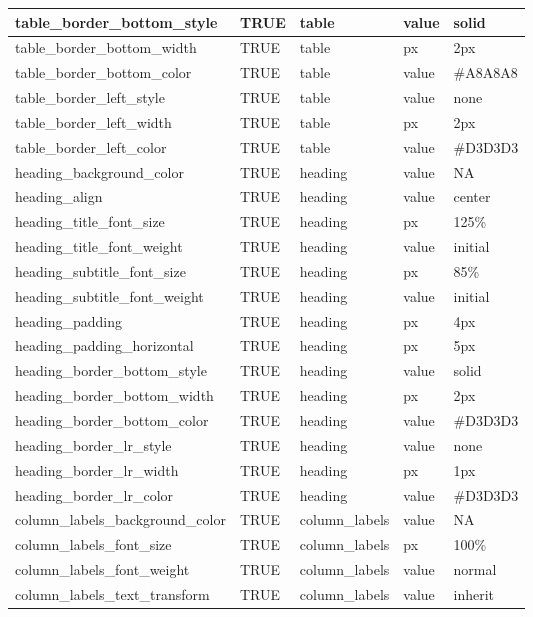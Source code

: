\documentclass[
  letterpaper,
  DIV=11,
  numbers=noendperiod]{scrartcl}
\begin{document}
\begin{table}
{\begin{tabular}[t]{l|l|l|l|l}
\hline
table\_border\_bottom\_style & TRUE & table & value & solid\\
\hline
table\_border\_bottom\_width & TRUE & table & px & 2px\\
\hline
table\_border\_bottom\_color & TRUE & table & value & \#A8A8A8\\
\hline
table\_border\_left\_style & TRUE & table & value & none\\
\hline
table\_border\_left\_width & TRUE & table & px & 2px\\
\hline
table\_border\_left\_color & TRUE & table & value & \#D3D3D3\\
\hline
heading\_background\_color & TRUE & heading & value & NA\\
\hline
heading\_align & TRUE & heading & value & center\\
\hline
heading\_title\_font\_size & TRUE & heading & px & 125\%\\
\hline
heading\_title\_font\_weight & TRUE & heading & value & initial\\
\hline
heading\_subtitle\_font\_size & TRUE & heading & px & 85\%\\
\hline
heading\_subtitle\_font\_weight & TRUE & heading & value & initial\\
\hline
heading\_padding & TRUE & heading & px & 4px\\
\hline
heading\_padding\_horizontal & TRUE & heading & px & 5px\\
\hline
heading\_border\_bottom\_style & TRUE & heading & value & solid\\
\hline
heading\_border\_bottom\_width & TRUE & heading & px & 2px\\
\hline
heading\_border\_bottom\_color & TRUE & heading & value & \#D3D3D3\\
\hline
heading\_border\_lr\_style & TRUE & heading & value & none\\
\hline
heading\_border\_lr\_width & TRUE & heading & px & 1px\\
\hline
heading\_border\_lr\_color & TRUE & heading & value & \#D3D3D3\\
\hline
column\_labels\_background\_color & TRUE & column\_labels & value & NA\\
\hline
column\_labels\_font\_size & TRUE & column\_labels & px & 100\%\\
\hline
column\_labels\_font\_weight & TRUE & column\_labels & value & normal\\
\hline
column\_labels\_text\_transform & TRUE & column\_labels & value & inherit\\

\end{tabular}}
\end{table}
\end{document}
